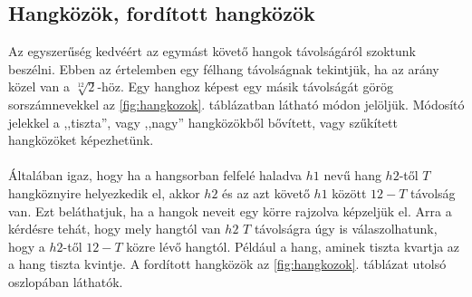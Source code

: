 \subsection{Hangközök, fordított hangközök}
\label{sec:hangkozok}
Az egyszerűség kedvéért az egymást követő  hangok távolságáról szoktunk beszélni. Ebben az értelemben egy félhang távolságnak tekintjük, ha az arány közel van a $\sqrt[12]{2}$-höz. Egy hanghoz képest egy másik távolságát görög sorszámnevekkel az \ref{fig:hangkozok}. táblázatban látható módon jelöljük. Módosító jelekkel a ,,tiszta'', vagy ,,nagy'' hangközökből bővített, vagy szűkített hangközöket képezhetünk. \\\\
Általában igaz, hogy ha a hangsorban felfelé haladva $h1$ nevű hang $h2$-től  $T$ hangköznyire helyezkedik el, akkor $h2$ és az azt követő $h1$ között $12-T$ távolság van. Ezt beláthatjuk, ha a hangok neveit egy körre rajzolva képzeljük el. Arra a kérdésre tehát, hogy mely hangtól van $h2$ $T$ távolságra úgy is válaszolhatunk, hogy a $h2$-től $12-T$ közre lévő hangtól. Például a hang, aminek tiszta kvartja \fisz az a \fisz hang tiszta kvintje. A fordított hangközök az \ref{fig:hangkozok}. táblázat utolsó oszlopában láthatók.
